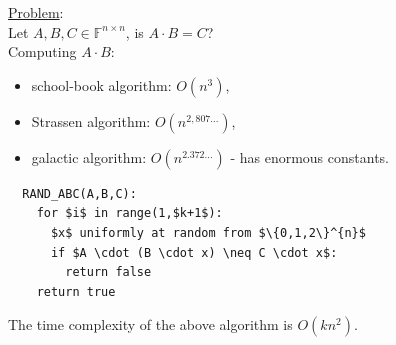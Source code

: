 \documentclass[a4paper, 12pt]{book}
\theoremstyle{definition}
\theoremstyle{remark}
\newcommand{\F}{\mathbb{F}}
\begin{document}
\underline{Problem}: \\
Let $A,B,C \in \F^{n \times n}$, is $A \cdot B = C$? \\
Computing $A \cdot B$:
\begin{itemize}
  \item school-book algorithm: $O\left(n^3\right)$,
  \item Strassen algorithm: $O\left(n^{2,807\dots}\right)$,
  \item galactic algorithm: $O\left(n^{2.372\dots}\right)$ - has enormous constants.
\end{itemize}
\begin{lstlisting}
  RAND_ABC(A,B,C):
    for $i$ in range(1,$k+1$):
      $x$ uniformly at random from $\{0,1,2\}^{n}$
      if $A \cdot (B \cdot x) \neq C \cdot x$:
        return false
    return true
\end{lstlisting}
The time complexity of the above algorithm is $O\left(k n^2\right)$. \\


\end{document}
